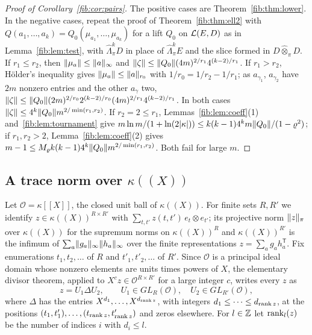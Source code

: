 \begin{proof}[Proof of Corollary~\ref{fib:cor:pairs}]
The positive cases are Theorem~\ref{fib:thm:lower}. In the negative cases, repeat the proof of
Theorem~\ref{fib:thm:ell2} with $Q(a_1,\dots,a_k)=Q_0(\mu_{a_1},\dots,\mu_{a_k})$ for a lift $Q_0$ on $\mathcal L(E,D)$ as in
Lemma~\ref{fib:lem:test}, with $\widehat\Lambda^k_\pi D$ in place of $\widehat\Lambda^k_\pi E$ and the slice formed in
$D\widehat\otimes_\pi D$. If $r_1\le r_2$, then $\lVert \mu_a\rVert\le\lVert a\rVert_\infty$ and
$\lVert \zeta\rVert\le\lVert Q_0\rVert(4m)^{2/r_1}4^{(k-2)/r_1}$. If $r_1>r_2$, H\"older's inequality gives
$\lVert \mu_a\rVert\le\lVert a\rVert_{r_0}$ with $1/r_0=1/r_2-1/r_1$; as $a_{\gamma_1}$, $a_{\gamma_2}$ have $2m$ nonzero entries and
the other $a_\gamma$ two, $\lVert \zeta\rVert\le\lVert Q_0\rVert(2m)^{2/r_0}2^{(k-2)/r_0}(4m)^{2/r_1}4^{(k-2)/r_1}$. In both cases
$\lVert \zeta\rVert\le4^k\lVert Q_0\rVert m^{2/\min(r_1,r_2)}$. If $r_2=2\le r_1$, Lemmas~\ref{fib:lem:coeff}(1)
and~\ref{fib:lem:tournament} give $m\ln m/(1+\ln(2\lvert \kappa\rvert))\le k(k-1)4^km\lVert Q_0\rVert/(1-\varrho^2)$; if $r_1,r_2>2$,
Lemma~\ref{fib:lem:coeff}(2) gives $m-1\le M_\varrho k(k-1)4^k\lVert Q_0\rVert m^{2/\min(r_1,r_2)}$. Both fail for large $m$.
\end{proof}

\subsection{A trace norm over \texorpdfstring{$\kappa((X))$}{a Laurent series field}}\label{frc:ssec:trace}
Let $\mathcal O=\kappa[[X]]$, the closed unit ball of $\kappa((X))$. For finite sets $R,R'$ we identify
$z\in\kappa((X))^{R\times R'}$ with $\sum_{t,t'}z(t,t')\,e_t\otimes e_{t'}$; its projective norm $\lVert z\rVert_\pi$ over
$\kappa((X))$ for the supremum norms on $\kappa((X))^R$ and $\kappa((X))^{R'}$ is the infimum of
$\sum_a\lVert g_a\rVert_\infty\lVert h_a\rVert_\infty$ over the finite representations $z=\sum_ag_ah_a^{\mathsf T}$. Fix enumerations $t_1,t_2,\dots$ of $R$ and $t'_1,t'_2,\dots$ of $R'$. Since $\mathcal O$ is
a principal ideal domain whose nonzero elements are units times powers of $X$, the elementary divisor theorem, applied to
$X^cz\in\mathcal O^{R\times R'}$ for a large integer $c$, writes every $z$ as
\begin{equation}\label{frc:eq:smith}
 z=U_1\Delta U_2,\qquad U_1\in GL_R(\mathcal O),\quad U_2\in GL_{R'}(\mathcal O),
\end{equation}
where $\Delta$ has the entries $X^{d_1},\dots,X^{d_{\operatorname{rank} z}}$, with integers $d_1\le\dots\le d_{\operatorname{rank} z}$, at the positions
$(t_1,t'_1),\dots,(t_{\operatorname{rank} z},t'_{\operatorname{rank} z})$ and zeros elsewhere. For $l\in\mathbb Z$ let $\operatorname{rank}_l(z)$ be the number of indices
$i$ with $d_i\le l$.


